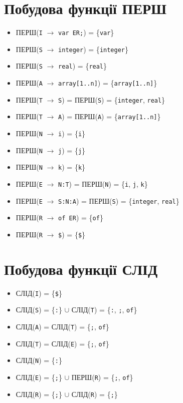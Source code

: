 \newpage
\section{Побудова функції ПЕРШ}
\begin{itemize}
    \item[]  ПЕРШ(\verb|I| $\to$ \verb|var ER;|)      = \{\verb|var|\}
    \item[]  ПЕРШ(\verb|S| $\to$ \verb|integer|)      = \{\verb|integer|\}
    \item[]  ПЕРШ(\verb|S| $\to$ \verb|real|)         = \{\verb|real|\}
    \item[]  ПЕРШ(\verb|A| $\to$ \verb|array[1..n]|)  = \{\verb|array[1..n]|\}
    \item[]  ПЕРШ(\verb|T| $\to$ \verb|S|)            = ПЕРШ(\verb|S|) = \{\verb|integer|, \verb|real|\}
    \item[]  ПЕРШ(\verb|T| $\to$ \verb|A|)            = ПЕРШ(\verb|A|) = \{\verb|array[1..n]|\}
    \item[]  ПЕРШ(\verb|N| $\to$ \verb|i|)            = \{\verb|i|\}
    \item[]  ПЕРШ(\verb|N| $\to$ \verb|j|)            = \{\verb|j|\}
    \item[]  ПЕРШ(\verb|N| $\to$ \verb|k|)            = \{\verb|k|\}
    \item[]  ПЕРШ(\verb|E| $\to$ \verb|N:T|)          = ПЕРШ(\verb|N|) = \{\verb|i|, \verb|j|, \verb|k|\}
    \item[]  ПЕРШ(\verb|E| $\to$ \verb|S:N:A|)        = ПЕРШ(\verb|S|) = \{\verb|integer|, \verb|real|\}
    \item[]  ПЕРШ(\verb|R| $\to$ \verb|of ER|)        = \{\verb|of|\}
    \item[]  ПЕРШ(\verb|R| $\to$ \verb|$|)            = \{\verb|$|\}
\end{itemize}

\section{Побудова функції СЛІД}
\begin{itemize}
    \item[]  СЛІД(\verb|I|) = \{\verb|$|\}
    \item[]  СЛІД(\verb|S|) = \{\verb|:|\} $\cup$ СЛІД(\verb|T|) = \{\verb|:|, \verb|;|, \verb|of|\}
    \item[]  СЛІД(\verb|A|) = СЛІД(\verb|T|) = \{\verb|;|, \verb|of|\}
    \item[]  СЛІД(\verb|T|) = СЛІД(\verb|E|) = \{\verb|;|, \verb|of|\}
    \item[]  СЛІД(\verb|N|) = \{\verb|:|\}
    \item[]  СЛІД(\verb|E|) = \{\verb|;|\} $\cup$ ПЕРШ(\verb|R|) = \{\verb|;|, \verb|of|\}
    \item[]  СЛІД(\verb|R|) = \{\verb|;|\} $\cup$ СЛІД(\verb|R|) = \{\verb|;|\}
\end{itemize}

